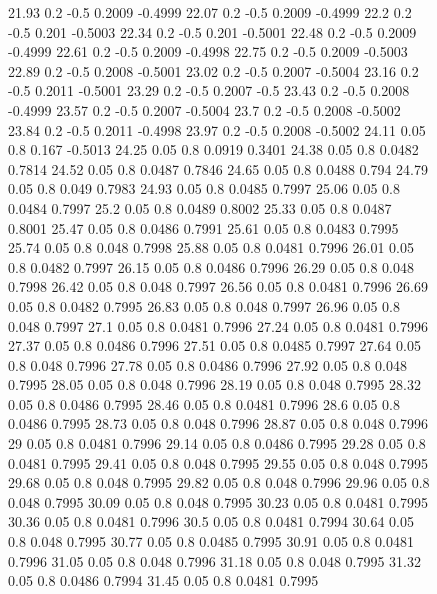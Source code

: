 \documentclass[
    12pt,
    oneside,
    a4paper,
    chapter=TITLE,
    section=TITLE,
    english,
    brazil
]{abntex2}
\begin{document}
\begin{figure}[H]
{        21.93 0.2 -0.5 0.2009 -0.4999
        22.07 0.2 -0.5 0.2009 -0.4999
        22.2 0.2 -0.5 0.201 -0.5003
        22.34 0.2 -0.5 0.201 -0.5001
        22.48 0.2 -0.5 0.2009 -0.4999
        22.61 0.2 -0.5 0.2009 -0.4998
        22.75 0.2 -0.5 0.2009 -0.5003
        22.89 0.2 -0.5 0.2008 -0.5001
        23.02 0.2 -0.5 0.2007 -0.5004
        23.16 0.2 -0.5 0.2011 -0.5001
        23.29 0.2 -0.5 0.2007 -0.5
        23.43 0.2 -0.5 0.2008 -0.4999
        23.57 0.2 -0.5 0.2007 -0.5004
        23.7 0.2 -0.5 0.2008 -0.5002
        23.84 0.2 -0.5 0.2011 -0.4998
        23.97 0.2 -0.5 0.2008 -0.5002
        24.11 0.05 0.8 0.167 -0.5013
        24.25 0.05 0.8 0.0919 0.3401
        24.38 0.05 0.8 0.0482 0.7814
        24.52 0.05 0.8 0.0487 0.7846
        24.65 0.05 0.8 0.0488 0.794
        24.79 0.05 0.8 0.049 0.7983
        24.93 0.05 0.8 0.0485 0.7997
        25.06 0.05 0.8 0.0484 0.7997
        25.2 0.05 0.8 0.0489 0.8002
        25.33 0.05 0.8 0.0487 0.8001
        25.47 0.05 0.8 0.0486 0.7991
        25.61 0.05 0.8 0.0483 0.7995
        25.74 0.05 0.8 0.048 0.7998
        25.88 0.05 0.8 0.0481 0.7996
        26.01 0.05 0.8 0.0482 0.7997
        26.15 0.05 0.8 0.0486 0.7996
        26.29 0.05 0.8 0.048 0.7998
        26.42 0.05 0.8 0.048 0.7997
        26.56 0.05 0.8 0.0481 0.7996
        26.69 0.05 0.8 0.0482 0.7995
        26.83 0.05 0.8 0.048 0.7997
        26.96 0.05 0.8 0.048 0.7997
        27.1 0.05 0.8 0.0481 0.7996
        27.24 0.05 0.8 0.0481 0.7996
        27.37 0.05 0.8 0.0486 0.7996
        27.51 0.05 0.8 0.0485 0.7997
        27.64 0.05 0.8 0.048 0.7996
        27.78 0.05 0.8 0.0486 0.7996
        27.92 0.05 0.8 0.048 0.7995
        28.05 0.05 0.8 0.048 0.7996
        28.19 0.05 0.8 0.048 0.7995
        28.32 0.05 0.8 0.0486 0.7995
        28.46 0.05 0.8 0.0481 0.7996
        28.6 0.05 0.8 0.0486 0.7995
        28.73 0.05 0.8 0.048 0.7996
        28.87 0.05 0.8 0.048 0.7996
        29 0.05 0.8 0.0481 0.7996
        29.14 0.05 0.8 0.0486 0.7995
        29.28 0.05 0.8 0.0481 0.7995
        29.41 0.05 0.8 0.048 0.7995
        29.55 0.05 0.8 0.048 0.7995
        29.68 0.05 0.8 0.048 0.7995
        29.82 0.05 0.8 0.048 0.7996
        29.96 0.05 0.8 0.048 0.7995
        30.09 0.05 0.8 0.048 0.7995
        30.23 0.05 0.8 0.0481 0.7995
        30.36 0.05 0.8 0.0481 0.7996
        30.5 0.05 0.8 0.0481 0.7994
        30.64 0.05 0.8 0.048 0.7995
        30.77 0.05 0.8 0.0485 0.7995
        30.91 0.05 0.8 0.0481 0.7996
        31.05 0.05 0.8 0.048 0.7996
        31.18 0.05 0.8 0.048 0.7995
        31.32 0.05 0.8 0.0486 0.7994
        31.45 0.05 0.8 0.0481 0.7995
}
\end{figure}
\end{document}
